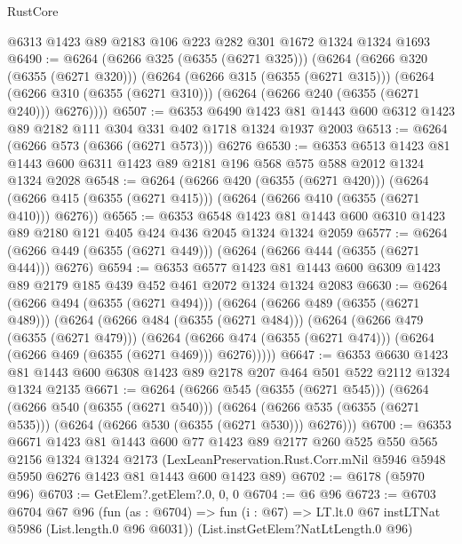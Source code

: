 \begin{lexlean}{RustCore}
\begin{coremodule}
    @6313
    @1423
    @89
    @2183
    @106
    @223
    @282
    @301
    @1672
    @1324
    @1324
    @1693
@6490 := @6264
    (@6266 @325 (@6355 (@6271 @325)))
    (@6264
      (@6266 @320 (@6355 (@6271 @320)))
      (@6264
        (@6266 @315 (@6355 (@6271 @315)))
        (@6264 (@6266 @310 (@6355 (@6271 @310))) (@6264 (@6266 @240 (@6355 (@6271 @240))) @6276))))
@6507 := @6353
    @6490
    @1423
    @81
    @1443
    @600
    @6312
    @1423
    @89
    @2182
    @111
    @304
    @331
    @402
    @1718
    @1324
    @1937
    @2003
@6513 := @6264 (@6266 @573 (@6366 (@6271 @573))) @6276
@6530 := @6353
    @6513
    @1423
    @81
    @1443
    @600
    @6311
    @1423
    @89
    @2181
    @196
    @568
    @575
    @588
    @2012
    @1324
    @1324
    @2028
@6548 := @6264
    (@6266 @420 (@6355 (@6271 @420)))
    (@6264 (@6266 @415 (@6355 (@6271 @415))) (@6264 (@6266 @410 (@6355 (@6271 @410))) @6276))
@6565 := @6353
    @6548
    @1423
    @81
    @1443
    @600
    @6310
    @1423
    @89
    @2180
    @121
    @405
    @424
    @436
    @2045
    @1324
    @1324
    @2059
@6577 := @6264 (@6266 @449 (@6355 (@6271 @449))) (@6264 (@6266 @444 (@6355 (@6271 @444))) @6276)
@6594 := @6353
    @6577
    @1423
    @81
    @1443
    @600
    @6309
    @1423
    @89
    @2179
    @185
    @439
    @452
    @461
    @2072
    @1324
    @1324
    @2083
@6630 := @6264
    (@6266 @494 (@6355 (@6271 @494)))
    (@6264
      (@6266 @489 (@6355 (@6271 @489)))
      (@6264
        (@6266 @484 (@6355 (@6271 @484)))
        (@6264
          (@6266 @479 (@6355 (@6271 @479)))
          (@6264
            (@6266 @474 (@6355 (@6271 @474)))
            (@6264 (@6266 @469 (@6355 (@6271 @469))) @6276)))))
@6647 := @6353
    @6630
    @1423
    @81
    @1443
    @600
    @6308
    @1423
    @89
    @2178
    @207
    @464
    @501
    @522
    @2112
    @1324
    @1324
    @2135
@6671 := @6264
    (@6266 @545 (@6355 (@6271 @545)))
    (@6264
      (@6266 @540 (@6355 (@6271 @540)))
      (@6264 (@6266 @535 (@6355 (@6271 @535))) (@6264 (@6266 @530 (@6355 (@6271 @530))) @6276)))
@6700 := @6353
    @6671
    @1423
    @81
    @1443
    @600
    @77
    @1423
    @89
    @2177
    @260
    @525
    @550
    @565
    @2156
    @1324
    @1324
    @2173
    (LexLeanPreservation.Rust.Corr.mNil @5946 @5948 @5950 @6276 @1423 @81 @1443 @600 @1423 @89)
@6702 := @6178 (@5970 @96)
@6703 := GetElem?.getElem?.{0, 0, 0}
@6704 := @6 @96
@6723 := @6703
    @6704
    @67
    @96
    (fun (as : @6704) => fun (i : @67) => LT.lt.{0} @67 instLTNat @5986 (List.length.{0} @96 @6031))
    (List.instGetElem?NatLtLength.{0} @96)

\end{coremodule}
\end{lexlean}
